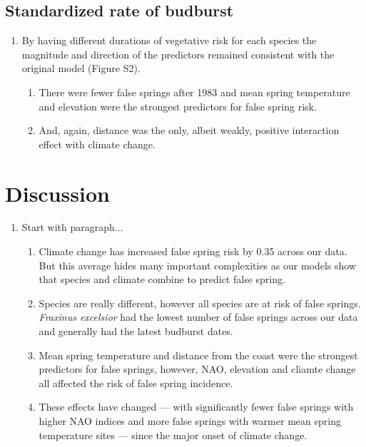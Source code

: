 \documentclass{article}\usepackage[]{graphicx}\usepackage[]{color}
\begin{document}
\subsection*{Standardized rate of budburst}
\begin{enumerate}

\item By having different durations of vegetative risk for each species the magnitude and direction of the predictors remained consistent with the original model (Figure S2). %
  \begin{enumerate}
  \item There were fewer false springs after 1983 and mean spring temperature and elevation were the strongest predictors for false spring risk. 
  \item And, again, distance was the only, albeit weakly, positive interaction effect with climate change. 
  \end{enumerate}

\end{enumerate}  
  


\section*{Discussion}
\begin{enumerate}
\item Start with paragraph...
  \begin{enumerate}
  \item Climate change has increased false spring risk by 0.35 across our data. But this average hides many important complexities as our models show that species and climate combine to predict false spring. 
  \item Species are really different, however all species are at risk of false springs. \textit{Fraxinus excelsior} had the lowest number of false springs across our data and generally had the latest budburst dates. 
  \item Mean spring temperature and distance from the coast were the strongest predictors for false springs, however, NAO, elevation and cliamte change all affected the risk of false spring incidence. 
  \item These effects have changed --- with significantly fewer false springs with higher NAO indices and more false springs with warmer mean spring temperature sites --- since the major onset of climate change. 
  \end{enumerate}
\end{enumerate}
\end{document}
